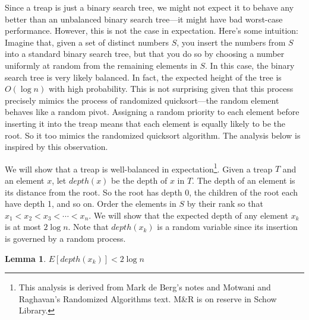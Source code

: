 \documentclass[11pt]{article}
\newtheorem{lemma}{Lemma}
\begin{document}
Since a treap is just a binary search tree, we might not expect it to behave any better than an unbalanced binary search tree---it might have bad worst-case performance.  However, this is not the case in expectation.  Here's some intuition:  Imagine that, given a set of distinct numbers $S$, you insert the numbers from $S$ into a standard binary search tree, but that you do so by choosing a number uniformly at random from the remaining elements in $S$.  In this case, the binary search tree is very likely balanced.  In fact, the expected height of the tree is $O(\log n)$ with high probability.  This is not surprising given that this process precisely mimics the process of randomized quicksort---the random element behaves like a random pivot.  Assigning a random priority to each element before inserting it into the treap means that each element is equally likely to be the root.  So it too mimics the randomized quicksort algorithm.  The analysis below is inspired by this observation.

We will show that a treap is well-balanced in expectation\footnote{This analysis is derived from Mark de Berg's notes and Motwani and Raghavan's Randomized Algorithms text.  M\&R is on reserve in Schow Library.}.  Given a treap $T$ and an element $x$, let $depth(x)$ be the depth of $x$ in $T$.  The depth of an element is its distance from the root.   So the root has depth 0, the children of the root each have depth 1, and so on.  Order the elements in $S$ by their rank so that $x_{1} < x_{2} < x_{3} < \cdots < x_{n}$.  We will show that the expected depth of any element $x_{k}$ is at most $2\log n$.  Note that $depth(x_{k})$ is a random variable since its insertion is governed by a random process.  

\begin{lemma}
$E[depth(x_{k})] < 2 \log n$
\end{lemma}
\end{document}
